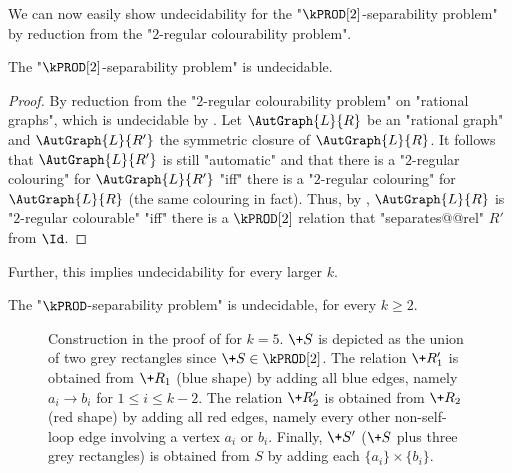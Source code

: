We can now easily show undecidability for the "$\kPROD[2]$-separability problem" by reduction from the "$2$-regular colourability problem".
\begin{lemma}\AP\label{lem:aut-2prod-sep-undec}
    The "$\kPROD[2]$-separability problem" is undecidable.
\end{lemma}
\begin{proof}
    By reduction from the "$2$-regular colourability problem" on "rational graphs", which is undecidable by . Let $\AutGraph{L}{R}$ be an "rational graph" and $\AutGraph{L}{R'}$ the symmetric closure of $\AutGraph{L}{R}$. It follows that $\AutGraph{L}{R'}$ is still "automatic" and that there is a "$2$-regular colouring" for $\AutGraph{L}{R'}$ "iff" there is a "$2$-regular colouring" for $\AutGraph{L}{R}$ (the same colouring in fact).
    Thus, by , $\AutGraph{L}{R}$ is "$2$-regular colourable" "iff" 
    there is a $\kPROD[2]$ relation that "separates@@rel" $R'$ from $\Id$.
\end{proof}

Further, this implies undecidability for every larger $k$.
\begin{theorem}
    \AP\label{thm:kprod-undecidable}
    The "$\kPROD$-separability problem" is undecidable, for every $k \geq 2$.
\end{theorem}

\begin{figure}
    \centering
    \begin{tikzpicture}
        
    \end{tikzpicture}
    \caption{
        \AP\label{fig:2prod-to-kprod}
        Construction in the proof of  for $k = 5$. $\+S$ is depicted as the union of two grey rectangles since $\+S \in \kPROD[2]$.
        The relation $\+R'_1$ is obtained from $\+R_1$ (blue shape) by adding all blue edges,
        namely $a_i \to b_i$ for $1\leq i \leq k-2$. The relation $\+R'_2$ is obtained from $\+R_2$ (red shape) by adding
        all red edges, namely every other non-self-loop edge involving a vertex $a_i$ or $b_i$.
        Finally, $\+S'$ ($\+S$ plus three grey rectangles) is obtained from $S$ by adding
        each $\{a_i\} \times \{b_i\}$.
    }
\end{figure}

